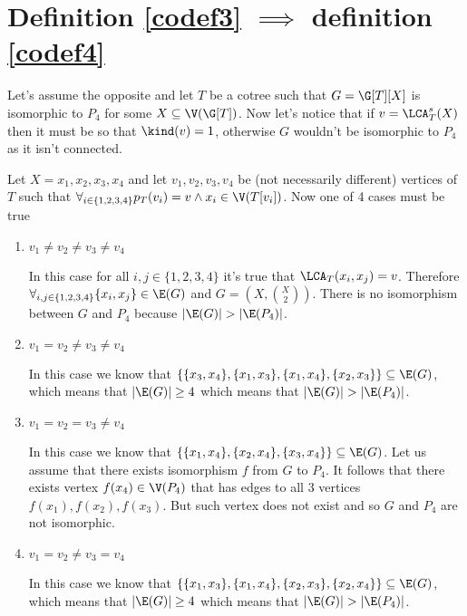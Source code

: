 \section{Definition \ref{codef3} $\implies$ definition \ref{codef4}}

Let's assume the opposite and let $T$ be a cotree such that $G = \G[T][X]$ is isomorphic to $P_4$ for some $X \subseteq \V(\G[T])$. Now let's notice that if $v = \LCA_T^s(X)$ then it must be so that $\kind(v) = 1$, otherwise $G$ wouldn't be isomorphic to $P_4$ as it isn't connected.

Let $X = {x_1, x_2, x_3, x_4}$ and let $v_1, v_2, v_3, v_4$ be (not necessarily different) vertices of $T$ such that $\forall_{i \in \{1,2,3,4\}} p_T(v_i) = v \land x_i \in \V(T[v_i])$. Now one of 4 cases must be true
\begin{enumerate}
    \item $v_1 \neq v_2 \neq v_3 \neq v_4$

          In this case for all $i,j \in \{1,2,3,4\}$ it's true that $\LCA_T(x_i, x_j) = v$. Therefore \linebreak $\forall_{i,j \in \{1,2,3,4\}}\{x_i,x_j\}\in \E(G)$ and $G = (X, \binom{X}{2})$. There is no isomorphism between $G$ and $P_4$ because $|\E(G)| > |\E(P_4)|$.

    \item $v_1 = v_2 \neq v_3 \neq v_4$

          In this case we know that $\{\{x_3, x_4\}, \{x_1, x_3\}, \{x_1, x_4\}, \{x_2, x_3\}\} \subseteq \E(G)$, which means that $|\E(G)| \geq 4$ which means that $|\E(G)| > |\E(P_4)|$.


    \item $v_1 = v_2 = v_3 \neq v_4$

          In this case we know that $\{\{x_1, x_4\}, \{x_2, x_4\}, \{x_3, x_4\}\} \subseteq \E(G)$. Let us assume that there exists isomorphism $f$ from $G$ to $P_4$. It follows that there exists vertex $f(x_4) \in \V(P_4)$ that has edges to all 3 vertices $f(x_1), f(x_2), f(x_3)$. But such vertex does not exist and so $G$ and $P_4$ are not isomorphic.

    \item $v_1 = v_2 \neq v_3 = v_4$

          In this case we know that $\{\{x_1, x_3\}, \{x_1, x_4\}, \{x_2, x_3\}, \{x_2, x_4\}\} \subseteq \E(G)$, which means that $|\E(G)| \geq 4$ which means that $|\E(G)| > |\E(P_4)|$.
\end{enumerate}

